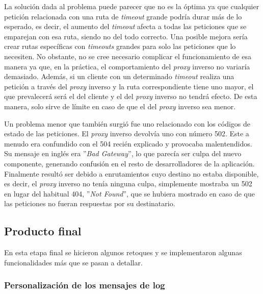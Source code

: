 \documentclass[11pt,spanish,listoffigures]{tfgetsinf}
\begin{document}
La solución dada al problema puede parecer que no es la óptima ya que cualquier petición relacionada con una ruta de \emph{timeout} grande podría durar más de lo esperado, es decir, el aumento del \emph{timeout} afecta a todas las peticiones que se emparejan con esa ruta, siendo no del todo correcto. Una posible mejora sería crear rutas específicas con \emph{timeouts} grandes para solo las peticiones que lo necesiten. No obstante, no se cree necesario complicar el funcionamiento de esa manera ya que, en la práctica, el comportamiento del \emph{proxy} inverso no variaría demasiado. Además, si un cliente con un determinado \emph{timeout} realiza una petición a través del \emph{proxy} inverso y la ruta correspondiente tiene uno mayor, el que prevalecerá será el del cliente y el del \emph{proxy} inverso no tendrá efecto. De esta manera, solo sirve de límite en caso de que el del \emph{proxy} inverso sea menor.

Un problema menor que también surgió fue uno relacionado con los códigos de estado de las peticiones. El \emph{proxy} inverso devolvía uno con número 502. Este a menudo era confundido con el 504 recién explicado y provocaba malentendidos. Su mensaje en inglés era ''\emph{Bad Gateway}'', lo que parecía ser culpa del nuevo componente, generando confusión en el resto de desarrolladores de la aplicación. Finalmente resultó ser debido a enrutamientos cuyo destino no estaba disponible, es decir, el \emph{proxy} inverso no tenía ninguna culpa, simplemente mostraba un 502 en lugar del habitual 404, ''\emph{Not Found}'', que se hubiera mostrado en caso de que las peticiones no fueran respuestas por su destinatario.


		\subsection{Producto final}

En esta etapa final se hicieron algunos retoques y se implementaron algunas funcionalidades más que se pasan a detallar.


			\subsubsection{Personalización de los mensajes de log}
\end{document}

